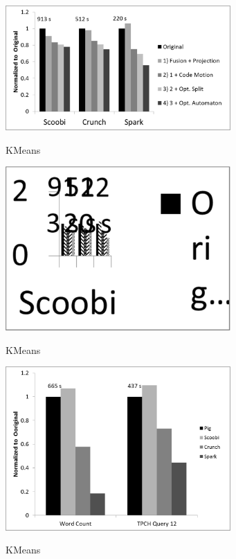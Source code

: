 \begin{figure}[!hbt]
    \includegraphics[width=8.6cm]{figures/word-count}
    \label{fig:word-count}\\%
   \caption{KMeans}
\end{figure}

\begin{figure}[!hbt]
    \includegraphics[width=8.6cm]{figures/k-means}
    \label{fig:k-means}\\%
   \caption{KMeans}
\end{figure}

\begin{figure}[!hbt]
    \includegraphics[width=8.6cm]{figures/pig}
    \label{fig:pig}\\%
   \caption{KMeans}
\end{figure}

